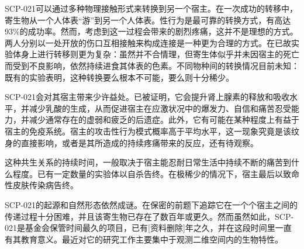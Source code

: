 SCP-021可以通过多种物理接触形式来转换到另一个宿主。在一次成功的转移中，寄生物从一个人体表“游”到另一个人体表。性行为是最可靠的转换方式，有高达93\%的成功率。然而，考虑到这一过程会带来的剧烈疼痛，这并不是理想的方式。两人分别以一处开放的伤口互相接触来构成连接是一种更为合理的方式。在已故实验体身上进行转移则更为复杂：虽然并不合情理，但寄生体似乎并未因宿主的死亡而受到不良影响，依然持续进食其体表的色素。不同物种间的转换情况目前未知：既有的实验表明，这种转换要么根本不可能，要么则十分稀少。

SCP-021会对其宿主带来少许益处。已被证明，它会提升肾上腺素的释放和吸收水平，并减少乳酸的生成，从而促进宿主在应激状况中的爆发力、自信和痛苦忍受能力，并减少通常存在的虚弱和疲乏的后遗症。此外，它有可能在某种程度上有益于宿主的免疫系统。宿主的攻击性行为模式概率高于平均水平，这一现象究竟是该纹身的直接影响，或者是其所造成的持续疼痛带来的反应，还有待观察。

这种共生关系的持续时间，一般取决于宿主能忍耐日常生活中持续不断的痛苦到什么程度。已有一定数量的实验体以自杀告终。在极稀少的情况下，宿主最后以致命性皮肤传染病告终。

SCP-021的起源和自然形态依然成谜。在保密的前题下追踪它在一个个宿主之间的传递过程十分困难，并且该寄生物已存在了数百年或更久。然而虽然如此，SCP-021是基金会保管时间最久的项目，已有[资料删除]年之久，并在这段时间里一直有其教育意义。最近对它的研究工作主要集中于观测二维空间内的生物特性。
